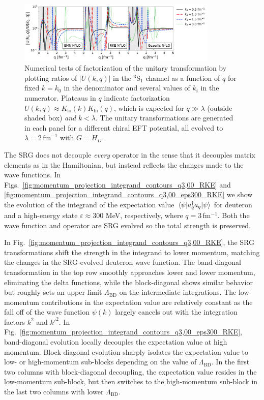 \documentclass[10pt,aps,prc,floatfix,twocolumn,nofootinbib]{revtex4-1}
\newcommand{\LambdaBD}{{\Lambda_{\text{BD}}}}
\newcommand{\ataq}{a^{\dagger}_q a_q}
\newcommand{\Klo}{K_{\text{lo}}}
\newcommand{\Khi}{K_{\text{hi}}}
\begin{document}
%
\begin{figure}[tbh]
	\includegraphics[clip,width=0.85\textwidth]{unitary_transformation_ratios_k0_0p1_kpoints_0p5_1p0_1p5_3p0kvnns_79_111_222_3S1_Wegner.pdf}%
	\caption{Numerical tests of factorization of the unitary transformation  by plotting ratios of $|U(k,q)|$ in the $^3$S$_1$ channel as a function of $q$ for fixed $k=k_0$ in the denominator and several values of $k_i$ in the numerator.
    Plateaus in $q$ indicate factorization $U(k,q) \approx \Klo(k)\Khi(q)$, which is expected for $q\gg\lambda$ (outside shaded box) \emph{and} $k < \lambda$. The unitary transformations are generated in each panel for a different chiral EFT potential, all evolved to $\lambda = 2\,\mbox{fm}^{-1}$ with $G = H_D$.}
	\label{fig:factorization_ratios}
\end{figure}
%

The SRG does not decouple \emph{every} operator in the sense that it decouples matrix elements as in the Hamiltonian, but instead reflects the changes made to the wave functions.
In Figs.~\ref{fig:momentum_projection_integrand_contours_q3,00_RKE} and \ref{fig:momentum_projection_integrand_contours_q3,00_eps300_RKE} we show the evolution of the integrand of the expectation value $\mel{\psi}{\ataq}{\psi}$ for deuteron and a high-energy state $\varepsilon \approx 300$ MeV, respectively, where $q=3$\,fm$^{-1}$.
Both the wave function and operator are SRG evolved so the total strength is preserved.


In Fig.~\ref{fig:momentum_projection_integrand_contours_q3,00_RKE}, the SRG transformations shift the strength in the integrand to lower momentum, matching the changes in the SRG-evolved deuteron wave function.
The band-diagonal transformation in the top row smoothly approaches lower and lower momentum, eliminating the delta functions, while the block-diagonal shows similar behavior but roughly sets an upper limit $\LambdaBD$ on the intermediate integrations.
The low-momentum contributions in the expectation value are relatively constant as the fall off of the wave function $\psi(k)$ largely cancels out with the integration factors $k^2$ and $k'^2$.
In Fig.~\ref{fig:momentum_projection_integrand_contours_q3,00_eps300_RKE}, band-diagonal evolution locally decouples the expectation value at high momentum.
Block-diagonal evolution sharply isolates the expectation value to low- or high-momentum sub-blocks depending on the value of $\LambdaBD$.
In the first two columns with block-diagonal decoupling, the expectation value resides in the low-momentum sub-block, but then switches to the high-momentum sub-block in the last two columns with lower $\LambdaBD$.
\end{document}
